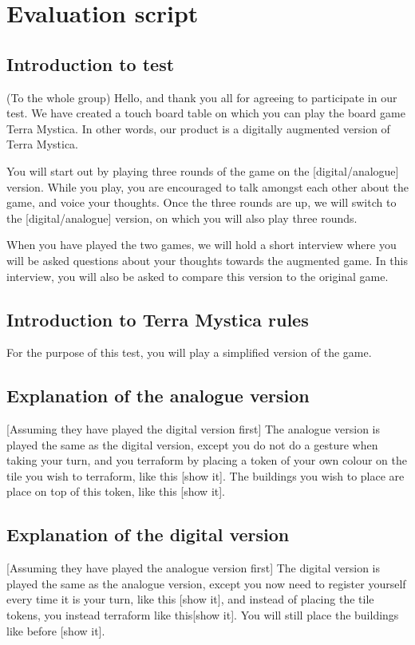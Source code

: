 \chapter{Evaluation script}\label{ch:TestScript}
\section{Introduction to test}
(To the whole group)
Hello, and thank you all for agreeing to participate in our test. We have created a touch board table on which you can play the board game Terra Mystica. In other words, our product is a digitally augmented version of Terra Mystica.

You will start out by playing three rounds of the game on the [digital/analogue] version. While you play, you are encouraged to talk amongst each other about the game, and voice your thoughts. Once the three rounds are up, we will switch to the [digital/analogue] version, on which you will also play three rounds.

When you have played the two games, we will hold a short interview where you will be asked questions about your thoughts towards the augmented game. In this interview, you will also be asked to compare this version to the original game.

\section{Introduction to Terra Mystica rules}
For the purpose of this test, you will play a simplified version of the game.


\section{Explanation of the analogue version}
[Assuming they have played the digital version first]
The analogue version is played the same as the digital version, except you do not do a gesture when taking your turn, and you terraform by placing a token of your own colour on the tile you wish to terraform, like this [show it]. The buildings you wish to place are place on top of this token, like this [show it].

\section{Explanation of the digital version}
[Assuming they have played the analogue version first]
The digital version is played the same as the analogue version, except you now need to register yourself every time it is your turn, like this [show it], and instead of placing the tile tokens, you instead terraform like this[show it]. You will still place the buildings like before [show it].

